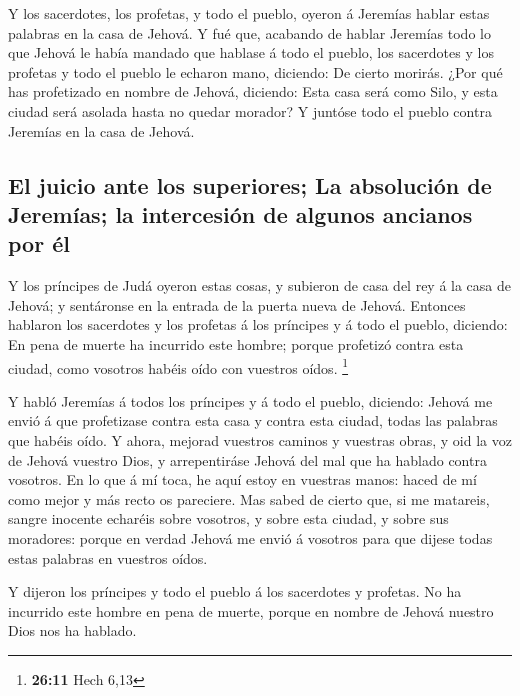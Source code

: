  Y los sacerdotes, los profetas, y todo el pueblo, oyeron
á Jeremías hablar estas palabras en la casa de Jehová.  Y
fué que, acabando de hablar Jeremías todo lo que Jehová le había mandado
que hablase á todo el pueblo, los sacerdotes y los profetas y todo el
pueblo le echaron mano, diciendo: De cierto morirás.  ¿Por
qué has profetizado en nombre de Jehová, diciendo: Esta casa será como
Silo, y esta ciudad será asolada hasta no quedar morador? Y juntóse todo
el pueblo contra Jeremías en la casa de Jehová.

\hypertarget{el-juicio-ante-los-superiores-la-absoluciuxf3n-de-jeremuxedas-la-intercesiuxf3n-de-algunos-ancianos-por-uxe9l}{%
\subsection{El juicio ante los superiores; La absolución de Jeremías; la
intercesión de algunos ancianos por
él}\label{el-juicio-ante-los-superiores-la-absoluciuxf3n-de-jeremuxedas-la-intercesiuxf3n-de-algunos-ancianos-por-uxe9l}}

 Y los príncipes de Judá oyeron estas cosas, y subieron
de casa del rey á la casa de Jehová; y sentáronse en la entrada de la
puerta nueva de Jehová.  Entonces hablaron los sacerdotes
y los profetas á los príncipes y á todo el pueblo, diciendo: En pena de
muerte ha incurrido este hombre; porque profetizó contra esta ciudad,
como vosotros habéis oído con vuestros oídos. \footnote{\textbf{26:11}
  Hech 6,13}

 Y habló Jeremías á todos los príncipes y á todo el
pueblo, diciendo: Jehová me envió á que profetizase contra esta casa y
contra esta ciudad, todas las palabras que habéis oído. 
Y ahora, mejorad vuestros caminos y vuestras obras, y oid la voz de
Jehová vuestro Dios, y arrepentiráse Jehová del mal que ha hablado
contra vosotros.  En lo que á mí toca, he aquí estoy en
vuestras manos: haced de mí como mejor y más recto os pareciere.
 Mas sabed de cierto que, si me matareis, sangre inocente
echaréis sobre vosotros, y sobre esta ciudad, y sobre sus moradores:
porque en verdad Jehová me envió á vosotros para que dijese todas estas
palabras en vuestros oídos.

 Y dijeron los príncipes y todo el pueblo á los
sacerdotes y profetas. No ha incurrido este hombre en pena de muerte,
porque en nombre de Jehová nuestro Dios nos ha hablado.

